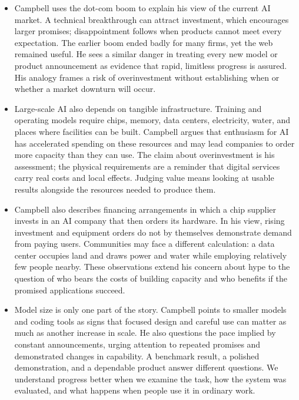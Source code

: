 \documentclass[10pt]{article}
\begin{document}
\begin{itemize}[leftmargin=1.25em, itemsep=0.3em, parsep=0pt, topsep=0pt]
    \item Campbell uses the dot-com boom to explain his view of the current AI market. A technical breakthrough can attract investment, which encourages larger promises; disappointment follows when products cannot meet every expectation. The earlier boom ended badly for many firms, yet the web remained useful. He sees a similar danger in treating every new model or product announcement as evidence that rapid, limitless progress is assured. His analogy frames a risk of overinvestment without establishing when or whether a market downturn will occur.

    \item Large-scale AI also depends on tangible infrastructure. Training and operating models require chips, memory, data centers, electricity, water, and places where facilities can be built. Campbell argues that enthusiasm for AI has accelerated spending on these resources and may lead companies to order more capacity than they can use. The claim about overinvestment is his assessment; the physical requirements are a reminder that digital services carry real costs and local effects. Judging value means looking at usable results alongside the resources needed to produce them.

    \item Campbell also describes financing arrangements in which a chip supplier invests in an AI company that then orders its hardware. In his view, rising investment and equipment orders do not by themselves demonstrate demand from paying users. Communities may face a different calculation: a data center occupies land and draws power and water while employing relatively few people nearby. These observations extend his concern about hype to the question of who bears the costs of building capacity and who benefits if the promised applications succeed.

    \item Model size is only one part of the story. Campbell points to smaller models and coding tools as signs that focused design and careful use can matter as much as another increase in scale. He also questions the pace implied by constant announcements, urging attention to repeated promises and demonstrated changes in capability. A benchmark result, a polished demonstration, and a dependable product answer different questions. We understand progress better when we examine the task, how the system was evaluated, and what happens when people use it in ordinary work.
\end{itemize}
\end{document}
